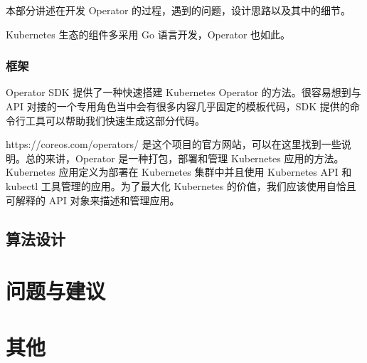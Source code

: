 本部分讲述在开发 Operator 的过程，遇到的问题，设计思路以及其中的细节。

Kubernetes 生态的组件多采用 Go 语言开发，Operator 也如此。

\subsubsection{框架}

Operator SDK 提供了一种快速搭建 Kubernetes Operator 的方法。很容易想到与 API 对接的一个专用角色当中会有很多内容几乎固定的模板代码，SDK 提供的命令行工具可以帮助我们快速生成这部分代码。

https://coreos.com/operators/ 是这个项目的官方网站，可以在这里找到一些说明。总的来讲，Operator 是一种打包，部署和管理 Kubernetes 应用的方法。Kubernetes 应用定义为部署在 Kubernetes 集群中并且使用 Kubernetes API 和 kubectl 工具管理的应用。为了最大化 Kubernetes 的价值，我们应该使用自恰且可解释的 API 对象来描述和管理应用。

\subsection{算法设计}

\section{问题与建议}

\section{其他}

